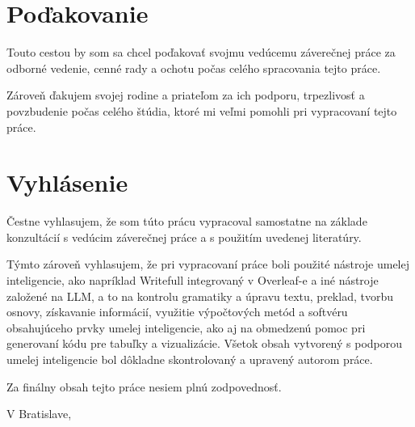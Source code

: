 \thispagestyle{empty}
\section*{Poďakovanie}

Touto cestou by som sa chcel poďakovať svojmu vedúcemu záverečnej práce za odborné vedenie, cenné rady a ochotu počas celého spracovania tejto práce.

Zároveň ďakujem svojej rodine a priateľom za ich podporu, trpezlivosť a povzbudenie počas celého štúdia, ktoré mi veľmi pomohli pri vypracovaní tejto práce.



\thispagestyle{empty}
\vspace*{\fill}
\section*{Vyhlásenie}

Čestne vyhlasujem, že som túto prácu vypracoval samostatne na základe konzultácií s vedúcim záverečnej práce a s použitím uvedenej literatúry.

Týmto zároveň vyhlasujem, že pri vypracovaní práce boli použité nástroje umelej inteligencie, ako napríklad Writefull integrovaný v Overleaf-e a iné nástroje založené na LLM, a to na kontrolu gramatiky a úpravu textu, preklad, tvorbu osnovy, získavanie informácií, využitie výpočtových metód a softvéru obsahujúceho prvky umelej inteligencie, ako aj na obmedzenú pomoc pri generovaní kódu pre tabuľky a vizualizácie. Všetok obsah vytvorený s podporou umelej inteligencie bol dôkladne skontrolovaný a upravený autorom práce.

Za finálny obsah tejto práce nesiem plnú zodpovednosť.


\vspace{2cm}
\mbox{}
V Bratislave, \myDateSK \hfill \myName
\mbox{}
